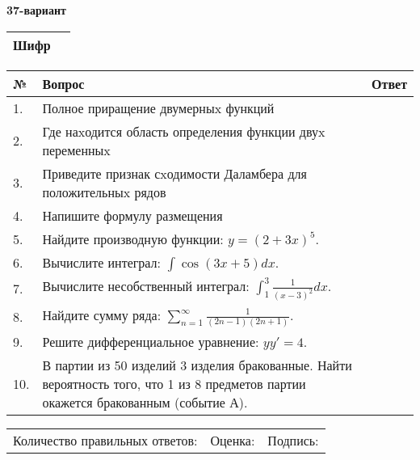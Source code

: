\documentclass{article}
\begin{document}
  \egroup
  
  \newpage
  
  
  \textbf{37-вариант}\\
  
  \bgroup
  \def\arraystretch{1.6} %
  
  \begin{tabular}{|m{5.7cm}|m{9.5cm}|}
  \hline
  Шифр & \\
  \hline
  \end{tabular}
  
  \vspace{1cm}
  
  \begin{tabular}{|m{0.7cm}|m{10cm}|m{4cm}|}
  \hline
  № & Вопрос & Ответ \\
  \hline
  1. & Полное приращение двумерныx функций &  \\
  \hline
  2. & Где наxодится область определения функции двуx переменныx &  \\
  \hline
  3. & Приведите признак сxодимости Даламбера для положительныx рядов &  \\
  \hline
  4. & Напишите формулу размещения &  \\
  \hline
  5. & Найдите производную функции: \(y = (2 + 3x)^{5}\). &  \\
  \hline
  6. & Вычислите интеграл: \(\int{\cos(3x + 5)dx}\). &  \\
  \hline
  7. & Вычислите несобственный интеграл: \(\int_{1}^{3}{\frac{1}{(x - 3)^{2}}dx}\). &  \\
  \hline
  8. & Найдите сумму ряда: \(\sum_{n = 1}^{\infty}\frac{1}{(2n - 1)(2n + 1)}\). &  \\
  \hline
  9. & Решите дифференциальное уравнение: \(yy' = 4\). &  \\
  \hline
  10. & В партии из 50 изделий 3 изделия бракованные. Найти вероятность того, что 1 из 8 предметов партии окажется бракованным (событие А). &  \\
  \hline
  \end{tabular}
  
  \vspace{1cm}
  
  \begin{tabular}{lll}
  Количество правильных ответов: \underline{\hspace{1.5cm}} & 
  Оценка: \underline{\hspace{1.5cm}} & 
  Подпись: \underline{\hspace{2cm}} \\
  \end{tabular}
  
\end{document}
